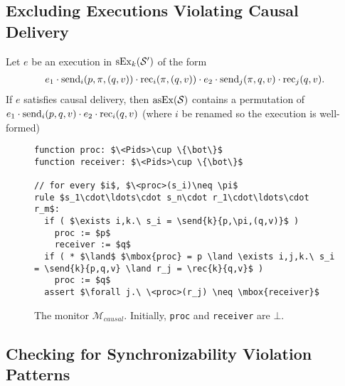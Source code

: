 \subsection{Excluding Executions Violating Causal Delivery}\label{ssec:verif2}

\begin{lemma}
Let $e$ be an execution in $\synchExec{\mathcal{S'}}{k}$ of the form 
\begin{align*}
e_1\cdot \send{i}{p,\pi,(q,v)}\cdot \rec{i}{\pi,(q,v)}\cdot e_2\cdot \send{j}{\pi,q,v}\cdot \rec{j}{q,v}.
\end{align*}
If $e$ satisfies causal delivery, then $\asynchExec{\mathcal{S}}$ contains a permutation of $e_1\cdot\send{i}{p,q,v} \cdot e_2\cdot \rec{i}{q,v}$ (where $i$ be renamed so the execution is well-formed) \end{lemma}

\begin{figure}
\begin{center}
\centering
\begin{lstlisting}
function proc: $\<Pids>\cup \{\bot\}$
function receiver: $\<Pids>\cup \{\bot\}$

// for every $i$, $\<proc>(s_i)\neq \pi$
rule $s_1\cdot\ldots\cdot s_n\cdot r_1\cdot\ldots\cdot r_m$:
  if ( $\exists i,k.\ s_i = \send{k}{p,\pi,(q,v)}$ )
    proc := $p$
    receiver := $q$
  if ( * $\land$ $\mbox{proc} = p \land \exists i,j,k.\ s_i = \send{k}{p,q,v} \land r_j = \rec{k}{q,v}$ )
    proc := $q$
  assert $\forall j.\ \<proc>(r_j) \neq \mbox{receiver}$
\end{lstlisting}
\end{center}
%
%    
\caption{The monitor $\mathcal{M}_{\mathit{causal}}$. Initially, {\tt proc} and {\tt receiver} are $\bot$.}
\label{fig:mon_causal}
\end{figure}

\subsection{Checking for Synchronizability Violation Patterns}


